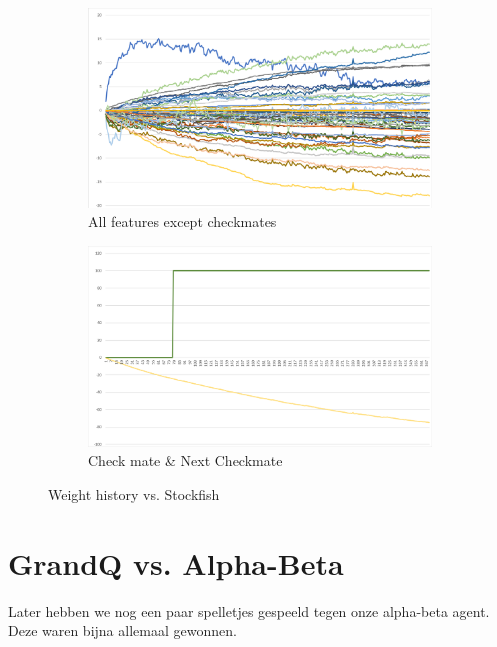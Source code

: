 \documentclass[a4paper,openany]{uantwerpenassignment}
\begin{document}
\begin{figure}[h]
    \centering
    \begin{subfigure}{.45\textwidth}
        \centering
        \includegraphics[width=\textwidth]{images/EXCEL_2020-12-12_18-01-58.png}
        \caption{All features except checkmates}
    \end{subfigure}
    \begin{subfigure}{.45\textwidth}
        \centering
        \includegraphics[width=\textwidth]{images/EXCEL_2020-12-12_18-01-10.png}
        \caption{Check mate \& Next Checkmate}
    \end{subfigure}
    \caption{Weight history vs. Stockfish}
\end{figure}

\pagebreak

\section{GrandQ vs. Alpha-Beta}

Later hebben we nog een paar spelletjes gespeeld tegen onze alpha-beta agent. Deze waren bijna allemaal gewonnen.
\end{document}
